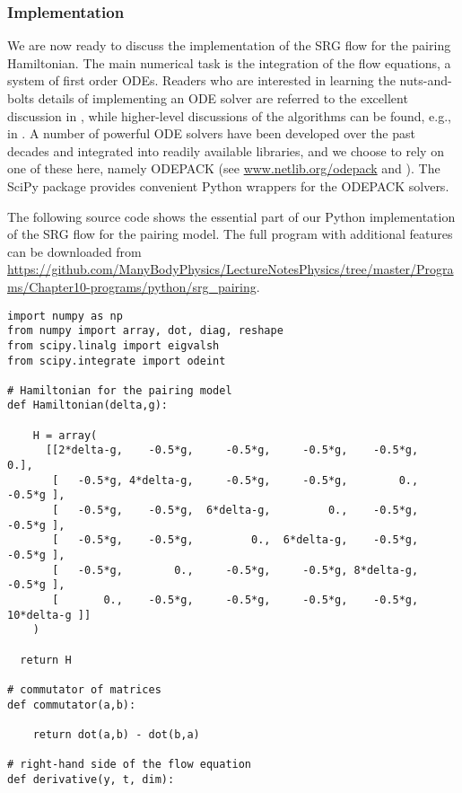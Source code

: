 {\subsubsection{\label{sec:srg_pairing_implementation}Implementation}
We are now ready to discuss the implementation of the SRG flow for the pairing
Hamiltonian. The main numerical task is the integration of the flow equations,
a system of first order ODEs. Readers who are interested in learning the 
nuts-and-bolts details of implementing an ODE solver are referred to the excellent 
discussion in \cite{Press:2007vn}, while higher-level discussions of the algorithms
can be found, e.g., in \cite{Shampine:1975qq,Landau:2012zr,Hjorth-Jensen:2015mz}.
A number of powerful ODE solvers have been developed over the past decades and 
integrated into readily available libraries, and we choose to rely on one of these 
here, namely ODEPACK (see \url{www.netlib.org/odepack} and 
\cite{Hindmarsh:1983pd,Radhakrishnan:1993fk,Brown:1989qd}). The SciPy package
provides convenient Python wrappers for the ODEPACK solvers.

The following source code shows the essential part of our Python implementation of
the SRG flow for the pairing model. The full program with additional features can 
be downloaded from 
\url{https://github.com/ManyBodyPhysics/LectureNotesPhysics/tree/master/Programs/Chapter10-programs/python/srg_pairing}.


\begin{lstlisting}
import numpy as np
from numpy import array, dot, diag, reshape
from scipy.linalg import eigvalsh
from scipy.integrate import odeint

# Hamiltonian for the pairing model
def Hamiltonian(delta,g):

    H = array(
      [[2*delta-g,    -0.5*g,     -0.5*g,     -0.5*g,    -0.5*g,          0.],
       [   -0.5*g, 4*delta-g,     -0.5*g,     -0.5*g,        0.,     -0.5*g ], 
       [   -0.5*g,    -0.5*g,  6*delta-g,         0.,    -0.5*g,     -0.5*g ], 
       [   -0.5*g,    -0.5*g,         0.,  6*delta-g,    -0.5*g,     -0.5*g ], 
       [   -0.5*g,        0.,     -0.5*g,     -0.5*g, 8*delta-g,     -0.5*g ], 
       [       0.,    -0.5*g,     -0.5*g,     -0.5*g,    -0.5*g, 10*delta-g ]]
    )

  return H

# commutator of matrices
def commutator(a,b):
    
    return dot(a,b) - dot(b,a)

# right-hand side of the flow equation
def derivative(y, t, dim):


\end{lstlisting}}
